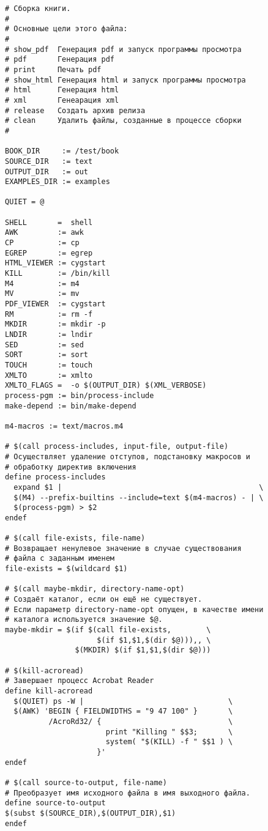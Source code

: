 \footnotesize{
\begin{verbatim}
# Сборка книги.
#
# Основные цели этого файла:
#
# show_pdf  Генерация pdf и запуск программы просмотра
# pdf       Генерация pdf
# print     Печать pdf
# show_html Генерация html и запуск программы просмотра
# html      Генерация html
# xml       Генеарация xml
# release   Создать архив релиза
# clean     Удалить файлы, созданные в процессе сборки
#

BOOK_DIR     := /test/book
SOURCE_DIR   := text
OUTPUT_DIR   := out
EXAMPLES_DIR := examples

QUIET = @

SHELL       =  shell
AWK         := awk
CP          := cp
EGREP       := egrep
HTML_VIEWER := cygstart
KILL        := /bin/kill
M4          := m4
MV          := mv
PDF_VIEWER  := cygstart
RM          := rm -f
MKDIR       := mkdir -p
LNDIR       := lndir
SED         := sed
SORT        := sort
TOUCH       := touch
XMLTO       := xmlto
XMLTO_FLAGS =  -o $(OUTPUT_DIR) $(XML_VERBOSE)
process-pgm := bin/process-include
make-depend := bin/make-depend

m4-macros := text/macros.m4

# $(call process-includes, input-file, output-file)
# Осуществляет удаление отступов, подстановку макросов и
# обработку директив включения
define process-includes
  expand $1 |                                             \
  $(M4) --prefix-builtins --include=text $(m4-macros) - | \
  $(process-pgm) > $2
endef

# $(call file-exists, file-name)
# Возвращает ненулевое значение в случае существования
# файла с заданным именем
file-exists = $(wildcard $1)

# $(call maybe-mkdir, directory-name-opt)
# Создаёт каталог, если он ещё не существует.
# Если параметр directory-name-opt опущен, в качестве имени
# каталога используется значение $@.
maybe-mkdir = $(if $(call file-exists,        \
                     $(if $1,$1,$(dir $@))),, \
                $(MKDIR) $(if $1,$1,$(dir $@)))

# $(kill-acroread)
# Завершает процесс Acrobat Reader
define kill-acroread
  $(QUIET) ps -W |                                 \
  $(AWK) 'BEGIN { FIELDWIDTHS = "9 47 100" }       \
          /AcroRd32/ {                             \
                       print "Killing " $$3;       \
                       system( "$(KILL) -f " $$1 ) \
                     }'
endef

# $(call source-to-output, file-name)
# Преобразует имя исходного файла в имя выходного файла.
define source-to-output
$(subst $(SOURCE_DIR),$(OUTPUT_DIR),$1)
endef


\end{verbatim}}
